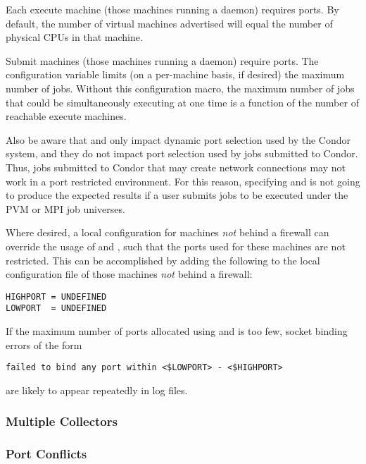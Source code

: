 Each execute machine (those machines running a  daemon)
requires
ports.
By default, the number of virtual machines advertised
will equal the number of physical CPUs in that machine.

Submit machines (those machines running a  daemon)
require
 ports.
The configuration variable 
limits (on a per-machine basis, if desired)
the maximum number of jobs.
Without this configuration macro,
the maximum number of jobs that could be simultaneously
executing at one time
is a function of the number of reachable execute machines. 

Also be aware that  and 
only impact dynamic port selection used by the Condor system,
and they do not impact port selection used by jobs submitted to Condor.
Thus, jobs submitted to Condor that may create
network connections may not work in a port restricted environment.
For this reason, specifying  and 
is not going to produce the
expected results if a user submits jobs to be executed under
the PVM or MPI job universes.

Where desired, a local
configuration for machines \emph{not} behind a firewall
can override the usage of  and ,
such that the ports used for these machines are not restricted.
This can be accomplished by adding the following to the
local configuration file of those machines \emph{not}
behind a firewall:
\begin{verbatim}
HIGHPORT = UNDEFINED
LOWPORT  = UNDEFINED
\end{verbatim}


If the maximum number of ports allocated using 
 and 
is too few,
socket binding errors of the form
\footnotesize
\begin{verbatim}
failed to bind any port within <$LOWPORT> - <$HIGHPORT>
\end{verbatim}
\normalsize
are likely to appear repeatedly in log files.


\subsubsection{\label{sec:Ports-MultipleCollectors}Multiple Collectors}
\Todo


\subsubsection{\label{sec:Ports-Conflicts}Port Conflicts}
\Todo

